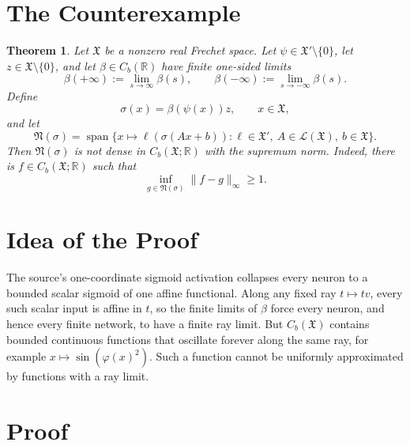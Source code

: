 \documentclass[11pt]{article}
\newtheorem{theorem}{Theorem}
\newcommand{\X}{\mathfrak X}
\newcommand{\N}{\mathfrak N}
\newcommand{\R}{\mathbb R}
\newcommand{\Span}{\operatorname{span}}
\newcommand{\Cb}{C_b}
\begin{document}
\section*{The Counterexample}

\begin{theorem}
Let \(\X\) be a nonzero real Frechet space. Let
\(\psi\in \X'\setminus\{0\}\), let \(z\in\X\setminus\{0\}\), and let
\(\beta\in C_b(\R)\) have finite one-sided limits
\[
  \beta(+\infty):=\lim_{s\to\infty}\beta(s),\qquad
  \beta(-\infty):=\lim_{s\to-\infty}\beta(s).
\]
Define
\[
  \sigma(x)=\beta(\psi(x))z,\qquad x\in\X,
\]
and let
\[
  \N(\sigma)=
  \Span\{x\mapsto \ell(\sigma(Ax+b)):
        \ell\in \X',\ A\in\mathcal L(\X),\ b\in\X\}.
\]
Then \(\N(\sigma)\) is not dense in \(\Cb(\X;\R)\) with the supremum norm.
Indeed, there is \(f\in\Cb(\X;\R)\) such that
\[
  \inf_{g\in \N(\sigma)}\|f-g\|_\infty \ge 1.
\]
\end{theorem}

\section*{Idea of the Proof}

The source's one-coordinate sigmoid activation collapses every neuron to a
bounded scalar sigmoid of one affine functional. Along any fixed ray
\(t\mapsto tv\), every such scalar input is affine in \(t\), so the finite
limits of \(\beta\) force every neuron, and hence every finite network, to have
a finite ray limit. But \(\Cb(\X)\) contains bounded continuous functions that
oscillate forever along the same ray, for example \(x\mapsto
\sin(\varphi(x)^2)\). Such a function cannot be uniformly approximated by
functions with a ray limit.

\section*{Proof}
\end{document}
